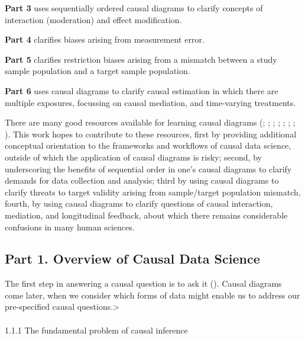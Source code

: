\documentclass[
  singlecolumn]{article}
\makeatletter
\let\oldparagraph\paragraph
\renewcommand{\paragraph}{
    \@ifstar
      \xxxParagraphStar
      \xxxParagraphNoStar
  }
\newcommand{\xxxParagraphStar}[1]{\oldparagraph*{#1}\mbox{}}
\newcommand{\xxxParagraphNoStar}[1]{\oldparagraph{#1}\mbox{}}
\makeatother
\begin{document}
\textbf{Part 3} uses sequentially ordered causal diagrams to clarify
concepts of interaction (moderation) and effect modification.

\textbf{Part 4} clarifies biases arising from measurement error.

\textbf{Part 5} clarifies restriction biases arising from a mismatch
between a study sample population and a target sample population.

\textbf{Part 6} uses causal diagrams to clarify causal estimation in
which there are multiple exposures, focussing on causal mediation, and
time-varying treatments.

There are many good resources available for learning causal diagrams
(;
;
;
;
;
; ; ). This work
hopes to contribute to these resources, first by providing additional
conceptual orientation to the frameworks and workflows of causal data
science, outside of which the application of causal diagrams is risky;
second, by underscoring the benefits of sequential order in one's causal
diagrams to clarify demands for data collection and analysis; third by
using causal diagrams to clarify threats to target validity arising from
sample/target population mismatch, fourth, by using causal diagrams to
clarify questions of causal interaction, mediation, and longitudinal
feedback, about which there remains considerable confusions in many
human sciences.

\subsection{Part 1. Overview of Causal Data
Science}\label{part-1.-overview-of-causal-data-science}

The first step in answering a causal question is to ask it
(). Causal
diagrams come later, when we consider which forms of data might enable
us to address our pre-specified causal questions.\textgreater{}

\paragraph{1.1.1 The fundamental problem of causal
inference}\label{the-fundamental-problem-of-causal-inference}
\end{document}
